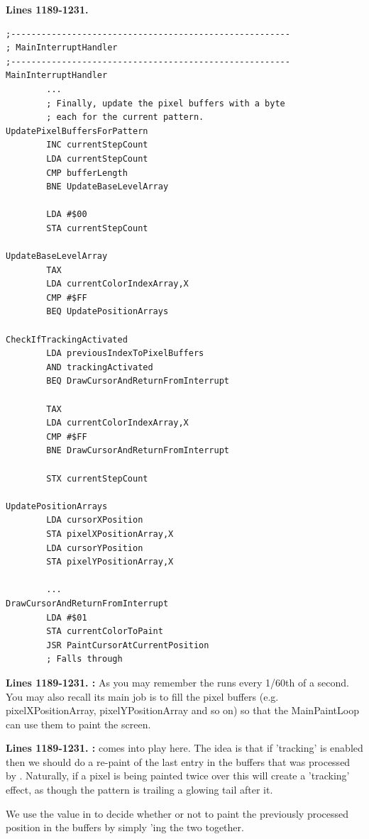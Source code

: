 \clearpage
\textbf{Lines 1189-1231. } 
\begin{lstlisting}
;-------------------------------------------------------
; MainInterruptHandler
;-------------------------------------------------------
MainInterruptHandler
        ...
        ; Finally, update the pixel buffers with a byte
        ; each for the current pattern.        
UpdatePixelBuffersForPattern    
        INC currentStepCount
        LDA currentStepCount
        CMP bufferLength
        BNE UpdateBaseLevelArray

        LDA #$00
        STA currentStepCount

UpdateBaseLevelArray   
        TAX 
        LDA currentColorIndexArray,X
        CMP #$FF
        BEQ UpdatePositionArrays

CheckIfTrackingActivated
        LDA previousIndexToPixelBuffers
        AND trackingActivated
        BEQ DrawCursorAndReturnFromInterrupt

        TAX 
        LDA currentColorIndexArray,X
        CMP #$FF
        BNE DrawCursorAndReturnFromInterrupt

        STX currentStepCount

UpdatePositionArrays   
        LDA cursorXPosition
        STA pixelXPositionArray,X
        LDA cursorYPosition
        STA pixelYPositionArray,X

        ...
DrawCursorAndReturnFromInterrupt    
        LDA #$01
        STA currentColorToPaint
        JSR PaintCursorAtCurrentPosition
        ; Falls through
\end{lstlisting}
\clearpage

\textbf{Lines 1189-1231. :} 
As you may remember the  runs every 1/60th of a
second.  You may also recall its main job is to fill the pixel buffers (e.g.
pixelXPositionArray, pixelYPositionArray and so on) so that the MainPaintLoop
can use them to paint the screen. 

\textbf{Lines 1189-1231. :} 
 comes into play here. The idea is that if 'tracking'
is enabled then we should do a re-paint of the last entry in the buffers that was
processed by . Naturally, if a pixel is being painted twice
over this will create a 'tracking' effect, as though the pattern is trailing a 
glowing tail after it.

We use the value in  to decide whether or not to paint
the previously processed position in the buffers by simply 'ing the
two together.

